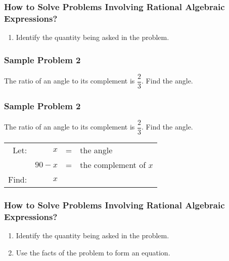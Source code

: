 \documentclass[14pt]{beamer}
\begin{document}
   \begin{frame}
   	\frametitle{How to Solve Problems Involving Rational Algebraic Expressions?}
   	\begin{enumerate}
   		\item Identify the quantity being asked in the problem. 
   	\end{enumerate}
   \end{frame}

   \begin{frame}
   	\frametitle{Sample Problem 2}
   	The ratio of an angle to its complement is $ \dfrac{2}{3} $. Find the angle.
   	
   	\pause \vone  \begin{center}
   	\end{center}
   \end{frame}

    \begin{frame}
    	\frametitle{Sample Problem 2}
    	The ratio of an angle to its complement is $ \dfrac{2}{3} $. Find the angle.
    	
    	\vone
    	\begin{tabular}{rrcl}
    		Let: & $ x $ & = & the angle \\
    		\pause	& $ 90 - x $ & = & the complement of $ x $ \\
    		\pause Find: & $ x $ & & \\
    	\end{tabular}
        \end{frame}

    \begin{frame}
    	\frametitle{How to Solve Problems Involving Rational Algebraic Expressions?}
    	\begin{enumerate}
    		\item Identify the quantity being asked in the problem.
    		\item Use the facts of the problem to form an equation.
    	\end{enumerate}
    \end{frame}
\end{document}
